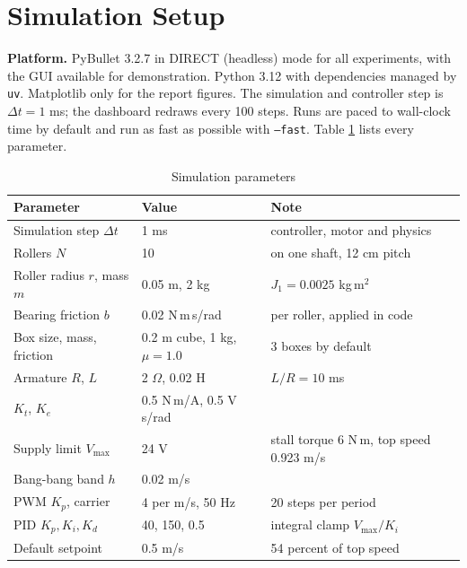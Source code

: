 \documentclass[12pt,a4paper]{article}
\begin{document}
\section{Simulation Setup}

\textbf{Platform.} PyBullet 3.2.7 in DIRECT (headless) mode for all experiments, with the GUI available for demonstration. Python 3.12 with dependencies managed by \texttt{uv}. Matplotlib only for the report figures. The simulation and controller step is $\Delta t = 1$ ms; the dashboard redraws every 100 steps. Runs are paced to wall-clock time by default and run as fast as possible with \texttt{--fast}. Table \ref{tab:params} lists every parameter.

\begin{table}[htbp]
\centering
\caption{Simulation parameters}
\label{tab:params}
\begin{tabular}{|p{3.6cm}|p{4.0cm}|p{5.6cm}|}
\hline
\textbf{Parameter} & \textbf{Value} & \textbf{Note} \\ \hline
Simulation step $\Delta t$ & 1 ms & controller, motor and physics \\ \hline
Rollers $N$ & 10 & on one shaft, 12 cm pitch \\ \hline
Roller radius $r$, mass $m$ & 0.05 m, 2 kg & $J_1 = 0.0025$ kg\,m$^2$ \\ \hline
Bearing friction $b$ & 0.02 N\,m\,s/rad & per roller, applied in code \\ \hline
Box size, mass, friction & 0.2 m cube, 1 kg, $\mu = 1.0$ & 3 boxes by default \\ \hline
Armature $R$, $L$ & 2 $\Omega$, 0.02 H & $L/R = 10$ ms \\ \hline
$K_t$, $K_e$ & 0.5 N\,m/A, 0.5 V\,s/rad & \\ \hline
Supply limit $V_{\max}$ & 24 V & stall torque 6 N\,m, top speed 0.923 m/s \\ \hline
Bang-bang band $h$ & 0.02 m/s & \\ \hline
PWM $K_p$, carrier & 4 per m/s, 50 Hz & 20 steps per period \\ \hline
PID $K_p, K_i, K_d$ & 40, 150, 0.5 & integral clamp $V_{\max}/K_i$ \\ \hline
Default setpoint & 0.5 m/s & 54 percent of top speed \\ \hline
\end{tabular}
\end{table}
\end{document}
